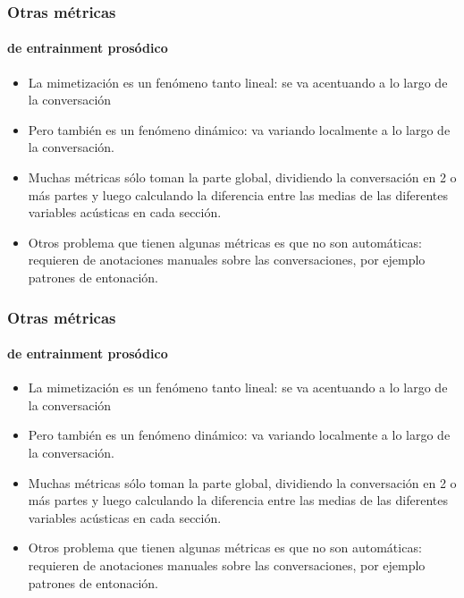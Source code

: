 
\begin{frame}
  \frametitle{Otras métricas}
  \framesubtitle{de entrainment prosódico}
  \begin{itemize}
    \item La mimetización es un fenómeno tanto lineal: se va acentuando a lo largo de la conversación
    \item Pero también es un fenómeno dinámico: va variando localmente a lo largo de la conversación.
    \item Muchas métricas sólo toman la parte global, dividiendo la conversación en 2 o más partes y luego calculando la diferencia entre las medias de las diferentes variables acústicas en cada sección.

    \item Otros problema que tienen algunas métricas es que no son automáticas: requieren de anotaciones manuales sobre las conversaciones, por ejemplo patrones de entonación.
  \end{itemize}

\end{frame}


\begin{frame}
  \frametitle{Otras métricas}
  \framesubtitle{de entrainment prosódico}
  \begin{itemize}
    \item La mimetización es un fenómeno tanto lineal: se va acentuando a lo largo de la conversación
    \item Pero también es un fenómeno dinámico: va variando localmente a lo largo de la conversación.
    \item Muchas métricas sólo toman la parte global, dividiendo la conversación en 2 o más partes y luego calculando la diferencia entre las medias de las diferentes variables acústicas en cada sección.

    \item Otros problema que tienen algunas métricas es que no son automáticas: requieren de anotaciones manuales sobre las conversaciones, por ejemplo patrones de entonación.
  \end{itemize}

\end{frame}


